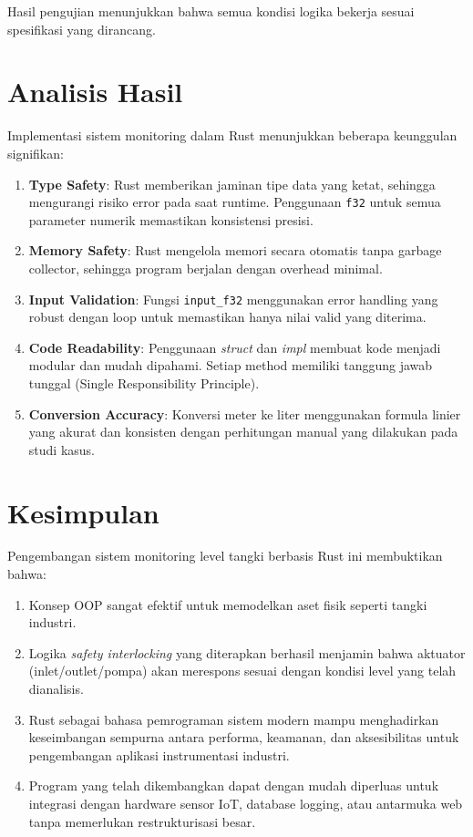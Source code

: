 \documentclass[12pt,a4paper]{article}
\begin{document}
Hasil pengujian menunjukkan bahwa semua kondisi logika bekerja sesuai spesifikasi yang dirancang.

\section{Analisis Hasil}

Implementasi sistem monitoring dalam Rust menunjukkan beberapa keunggulan signifikan:

\begin{enumerate}
    \item \textbf{Type Safety}: Rust memberikan jaminan tipe data yang ketat, sehingga mengurangi risiko error pada saat runtime. Penggunaan \texttt{f32} untuk semua parameter numerik memastikan konsistensi presisi.
    
    \item \textbf{Memory Safety}: Rust mengelola memori secara otomatis tanpa garbage collector, sehingga program berjalan dengan overhead minimal.
    
    \item \textbf{Input Validation}: Fungsi \texttt{input\_f32} menggunakan error handling yang robust dengan loop untuk memastikan hanya nilai valid yang diterima.
    
    \item \textbf{Code Readability}: Penggunaan \textit{struct} dan \textit{impl} membuat kode menjadi modular dan mudah dipahami. Setiap method memiliki tanggung jawab tunggal (Single Responsibility Principle).
    
    \item \textbf{Conversion Accuracy}: Konversi meter ke liter menggunakan formula linier yang akurat dan konsisten dengan perhitungan manual yang dilakukan pada studi kasus.
\end{enumerate}

\section{Kesimpulan}

Pengembangan sistem monitoring level tangki berbasis Rust ini membuktikan bahwa:

\begin{enumerate}
    \item Konsep OOP sangat efektif untuk memodelkan aset fisik seperti tangki industri.
    
    \item Logika \textit{safety interlocking} yang diterapkan berhasil menjamin bahwa aktuator (inlet/outlet/pompa) akan merespons sesuai dengan kondisi level yang telah dianalisis.
    
    \item Rust sebagai bahasa pemrograman sistem modern mampu menghadirkan keseimbangan sempurna antara performa, keamanan, dan aksesibilitas untuk pengembangan aplikasi instrumentasi industri.
    
    \item Program yang telah dikembangkan dapat dengan mudah diperluas untuk integrasi dengan hardware sensor IoT, database logging, atau antarmuka web tanpa memerlukan restrukturisasi besar.
\end{enumerate}
\end{document}
